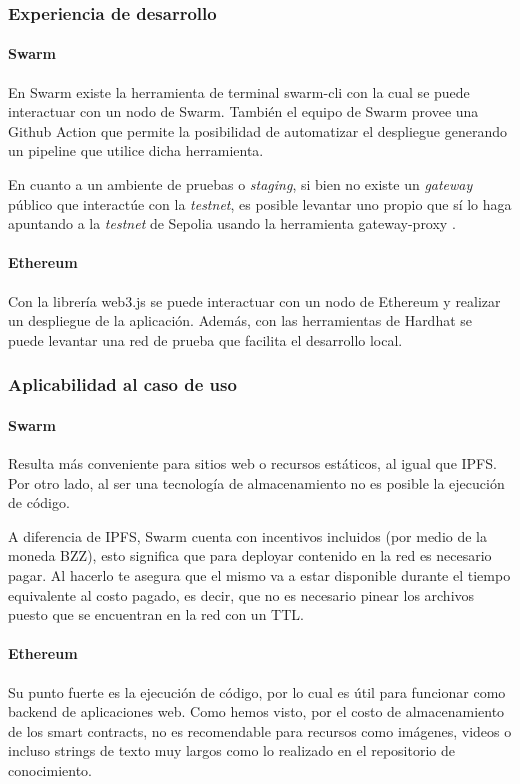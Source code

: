 \subsubsection{Experiencia de desarrollo} %

\paragraph{Swarm}
En Swarm existe la herramienta de terminal swarm-cli \cite{swarm-cli} con la cual se puede interactuar con un nodo de Swarm. También el equipo de Swarm provee una Github Action que permite la posibilidad de automatizar el despliegue generando un pipeline que utilice dicha herramienta.

En cuanto a un ambiente de pruebas o \textit{staging}, si bien no existe un \textit{gateway} público que interactúe con la \textit{testnet}, es posible levantar uno propio que sí lo haga apuntando a la \textit{testnet} de Sepolia usando la herramienta gateway-proxy \cite{gateway-proxy}.

\paragraph{Ethereum}
Con la librería web3.js se puede interactuar con un nodo de Ethereum y realizar un despliegue de la aplicación. Además, con las herramientas de Hardhat se puede levantar una red de prueba que facilita el desarrollo local.

\subsubsection{Aplicabilidad al caso de uso}

\paragraph{Swarm}
Resulta más conveniente para sitios web o recursos estáticos, al igual que IPFS. Por otro lado, al ser una tecnología de almacenamiento no es posible la ejecución de código.

A diferencia de IPFS, Swarm cuenta con incentivos incluidos (por medio de la moneda BZZ), esto significa que para deployar contenido en la red es necesario pagar. Al hacerlo te asegura que el mismo va a estar disponible durante el tiempo equivalente al costo pagado, es decir, que no es necesario pinear los archivos puesto que se encuentran en la red con un TTL.

\paragraph{Ethereum}
Su punto fuerte es la ejecución de código, por lo cual es útil para funcionar como backend de aplicaciones web. Como hemos visto, por el costo de almacenamiento de los smart contracts, no es recomendable para recursos como imágenes, videos o incluso strings de texto muy largos como lo realizado en el repositorio de conocimiento. 

